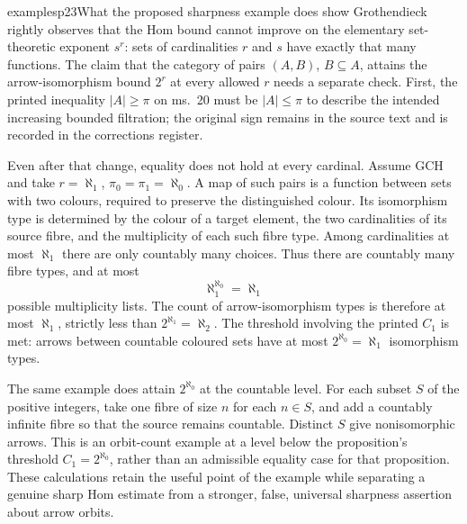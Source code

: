 \begin{dcomment}{examples}{p23}{What the proposed sharpness example does show}
Grothendieck rightly observes that the Hom bound cannot improve on the elementary set-theoretic exponent $s^r$: sets of cardinalities $r$ and $s$ have exactly that many functions. The claim that the category of pairs $(A,B)$, $B\subseteq A$, attains the arrow-isomorphism bound $2^r$ at every allowed $r$ needs a separate check. First, the printed inequality $|A|\geq\pi$ on ms.~20 must be $|A|\leq\pi$ to describe the intended increasing bounded filtration; the original sign remains in the source text and is recorded in the corrections register.

Even after that change, equality does not hold at every cardinal. Assume GCH and take $r=\aleph_1$, $\pi_0=\pi_1=\aleph_0$. A map of such pairs is a function between sets with two colours, required to preserve the distinguished colour. Its isomorphism type is determined by the colour of a target element, the two cardinalities of its source fibre, and the multiplicity of each such fibre type. Among cardinalities at most $\aleph_1$ there are only countably many choices. Thus there are countably many fibre types, and at most
\[
\aleph_1^{\aleph_0}=\aleph_1
\]
possible multiplicity lists. The count of arrow-isomorphism types is therefore at most $\aleph_1$, strictly less than $2^{\aleph_1}=\aleph_2$. The threshold involving the printed $C_1$ is met: arrows between countable coloured sets have at most $2^{\aleph_0}=\aleph_1$ isomorphism types.

The same example does attain $2^{\aleph_0}$ at the countable level. For each subset $S$ of the positive integers, take one fibre of size $n$ for each $n\in S$, and add a countably infinite fibre so that the source remains countable. Distinct $S$ give nonisomorphic arrows. This is an orbit-count example at a level below the proposition's threshold $C_1=2^{\aleph_0}$, rather than an admissible equality case for that proposition. These calculations retain the useful point of the example while separating a genuine sharp Hom estimate from a stronger, false, universal sharpness assertion about arrow orbits.
\end{dcomment}

